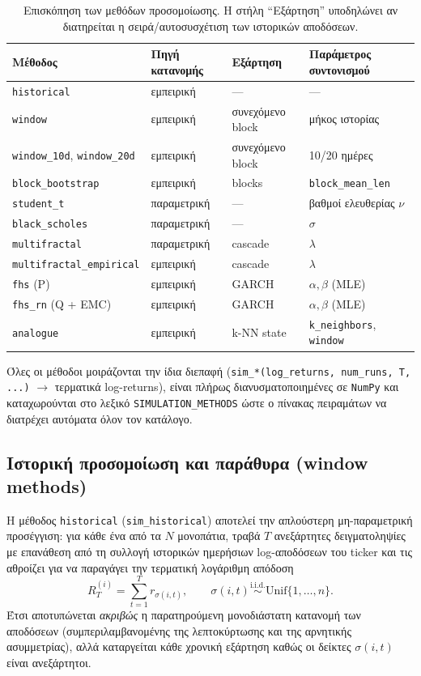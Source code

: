 \documentclass[12pt]{article}
\begin{document}
\begin{table}[h]
\centering
\small
\caption{Επισκόπηση των μεθόδων προσομοίωσης. Η στήλη ``Εξάρτηση'' υποδηλώνει αν διατηρείται η σειρά/αυτοσυσχέτιση των ιστορικών αποδόσεων.}
\label{tab:methods}
\begin{tabular}{p{4.0cm} p{2.4cm} p{2.4cm} p{4.0cm}}
\hline
Μέθοδος & Πηγή κατανομής & Εξάρτηση & Παράμετρος συντονισμού \\
\hline
\texttt{historical} & εμπειρική & --- & --- \\
\texttt{window} & εμπειρική & συνεχόμενο block & μήκος ιστορίας \\
\texttt{window\_10d}, \texttt{window\_20d} & εμπειρική & συνεχόμενο block & 10/20 ημέρες \\
\texttt{block\_bootstrap} & εμπειρική & blocks & \texttt{block\_mean\_len} \\
\texttt{student\_t} & παραμετρική & --- & βαθμοί ελευθερίας $\nu$ \\
\texttt{black\_scholes} & παραμετρική & --- & $\sigma$ \\
\texttt{multifractal} & παραμετρική & cascade & $\lambda$ \\
\texttt{multifractal\_empirical} & εμπειρική & cascade & $\lambda$ \\
\texttt{fhs} (P) & εμπειρική & GARCH & $\alpha,\beta$ (MLE) \\
\texttt{fhs\_rn} (Q + EMC) & εμπειρική & GARCH & $\alpha,\beta$ (MLE) \\
\texttt{analogue} & εμπειρική & k-NN state & \texttt{k\_neighbors}, \texttt{window} \\
\hline
\end{tabular}
\end{table}

Όλες οι μέθοδοι μοιράζονται την ίδια διεπαφή (\texttt{sim\_*(log\_returns, num\_runs, T, ...)} $\to$ τερματικά log-returns), είναι πλήρως διανυσματοποιημένες σε \texttt{NumPy} και καταχωρούνται στο λεξικό \texttt{SIMULATION\_METHODS} ώστε ο πίνακας πειραμάτων να διατρέχει αυτόματα όλον τον κατάλογο.

\subsection{Ιστορική προσομοίωση και παράθυρα (window methods)}
\label{sec:window_methods}
Η μέθοδος \texttt{historical} (\texttt{sim\_historical}) αποτελεί την απλούστερη μη-παραμετρική προσέγγιση: για κάθε ένα από τα $N$ μονοπάτια, τραβά $T$ ανεξάρτητες δειγματοληψίες με επανάθεση από τη συλλογή ιστορικών ημερήσιων log-αποδόσεων του ticker και τις αθροίζει για να παραγάγει την τερματική λογάριθμη απόδοση
\[
  R_T^{(i)} = \sum_{t=1}^{T} r_{\sigma(i,t)}, \qquad \sigma(i,t) \stackrel{\text{i.i.d.}}{\sim} \mathrm{Unif}\{1,\dots,n\}.
\]
Έτσι αποτυπώνεται \emph{ακριβώς} η παρατηρούμενη μονοδιάστατη κατανομή των αποδόσεων (συμπεριλαμβανομένης της λεπτοκύρτωσης και της αρνητικής ασυμμετρίας), αλλά καταργείται κάθε χρονική εξάρτηση καθώς οι δείκτες $\sigma(i,t)$ είναι ανεξάρτητοι.
\end{document}
